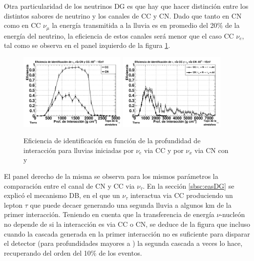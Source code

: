 	Otra particularidad de los neutrinos DG es que hay que hacer distinción entre los distintos sabores de neutrino y los canales de CC y CN.
	Dado que tanto en CN como en CC $\nu_\mu$ la energía transmitida a la lluvia es en promedio del 20$\%$ de la energía del neutrino, la eficiencia de estos canales será menor que el caso CC $\nu_e$, tal como se observa en el panel izquierdo de la figura \ref{fig:effDG_cc_nc}.
	\begin{figure}[ht!]
		\begin{center}
			\includegraphics[width=0.47\textwidth]{fig/resultadosAuger/eff_CCvsNC_85}
			\hfill
			\includegraphics[width=0.47\textwidth]{fig/resultadosAuger/eff_tau_1EeV_85}
			\caption{Eficiencia de identificación en función de la profundidad de interacción para lluvias iniciadas por $\nu_e$ via CC y por $\nu_x$ via CN con  y }
			\label{fig:effDG_cc_nc}
		\end{center}
	\end{figure}
	El panel derecho de la misma se observa para los mismos parámetros la comparación entre el canal de CN y CC via $\nu_\tau$.
	En la sección \ref{sbsc:easDG} se explicó el mecanismo DB, en el que un $\nu_\tau$ interactua via CC produciendo un lepton $\tau$ que puede decaer generando una segunda lluvia a algunos km de la primer interacción.
	Teniendo en cuenta que la transferencia de energía $\nu$-nucleón no depende de si la interacción es via CC o CN, se deduce de la figura que incluso cuando la cascada generada en la primer interacción no es suficiente para disparar el detector (para profundidades mayores a ) la segunda cascada a veces lo hace, recuperando del orden del 10$\%$ de los eventos.
	
